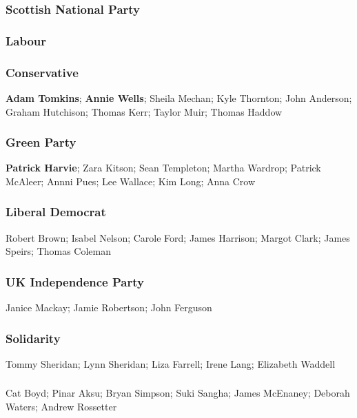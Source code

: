 \begin{resultsiii}
\subsubsection*{Scottish National Party}
\subsubsection*{Labour}
\subsubsection*{Conservative}
\textbf{Adam Tomkins}; \textbf{Annie Wells}; Sheila Mechan; Kyle Thornton; John Anderson; Graham Hutchison; Thomas Kerr; Taylor Muir; Thomas Haddow
\subsubsection*{Green Party}
\textbf{Patrick Harvie}; Zara Kitson; Sean Templeton; Martha Wardrop; Patrick McAleer; Annni Pues; Lee Wallace; Kim Long; Anna Crow
\subsubsection*{Liberal Democrat}
Robert Brown; Isabel Nelson; Carole Ford; James Harrison; Margot Clark; James Speirs; Thomas Coleman
\subsubsection*{UK Independence Party}
Janice Mackay; Jamie Robertson; John Ferguson
\subsubsection*{Solidarity}
Tommy Sheridan; Lynn Sheridan; Liza Farrell; Irene Lang; Elizabeth Waddell
\subsubsection*{\RISE}
Cat Boyd; Pinar Aksu; Bryan Simpson; Suki Sangha; James McEnaney; Deborah Waters; Andrew Rossetter

\end{resultsiii}
